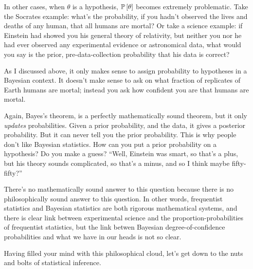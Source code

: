 In other cases, when $\theta$ is a hypothesis, $\mathbb{P}\left[{\theta}\right]$ becomes extremely problematic. Take the Socrates example: what's the probability, if you hadn't observed the lives and deaths of any human, that all humans are mortal? Or take a science example: if Einstein had showed you his general theory of relativity, but neither you nor he had ever observed any experimental evidence or astronomical data, what would you say is the prior, pre-data-collection probability that his data is correct?

As I discussed above, it only makes sense to assign probability to hypotheses in a Bayesian context. It doesn't make sense to ask on what fraction of replicates of Earth humans are mortal; instead you ask how confident you are that humans are mortal.

Again, Bayes's theorem, is a perfectly mathematically sound theorem, but it only \emph{updates} probabilities. Given a prior probability, and the data, it gives a posterior probability. But it can never tell you the prior probability. This is why people don't like Bayesian statistics. How can you put a prior probability on a hypothesis? Do you make a guess? ``Well, Einstein was smart, so that's a plus, but his theory sounds complicated, so that's a minus, and so I think maybe fifty-fifty?''

There's no mathematically sound answer to this question because there is no philosophically sound answer to this question. In other words, frequentist statistics and Bayesian statistics are both rigorous mathematical systems, and there is clear link between experimental science and the proportion-probabilities of frequentist statistics, but the link betwen Bayesian degree-of-confidence probabilities and what we have in our heads is not so clear.

Having filled your mind with this philosophical cloud, let's get down to the nuts and bolts of statistical inference.
